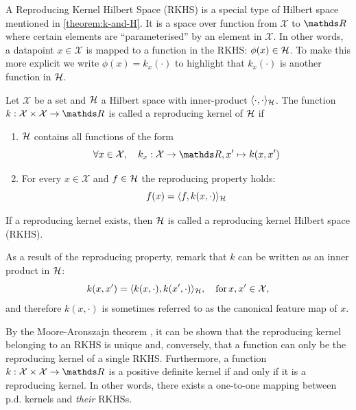 A Reproducing Kernel Hilbert Space (RKHS) is a special type of Hilbert space mentioned in \cref{theorem:k-and-H}. It is a space over function from $\mathcal{X}$ to $\Reals$ where certain elements are ``parameterised'' by an element in $\mathcal{X}$. In other words, a datapoint $x \in \mathcal{X}$ is mapped to a function in the RKHS: $\phi(x) \in {\mathcal{H}}$. To make this more explicit we write $\phi(x) = k_x(\cdot)$ to highlight that $k_x(\cdot)$ is another function in ${\mathcal{H}}$.
\begin{definition}
  \label{def:rkhs}
  Let $\mathcal{X}$ be a set and ${\mathcal{H}}$ a Hilbert space with inner-product $\langle \cdot, \cdot \rangle_{{\mathcal{H}}}$. The function $k: \mathcal{X} \times \mathcal{X} \rightarrow \Reals$ is called a reproducing kernel of ${\mathcal{H}}$ if
  \begin{enumerate}
    \item ${\mathcal{H}}$ contains all functions of the form
    \begin{equation}
      \forall x \in \mathcal{X},\quad k_x: \mathcal{X} \rightarrow \Reals, x' \mapsto k(x, x')
    \end{equation}
    \item For every $x \in \mathcal{X}$ and $f \in {\mathcal{H}}$ the reproducing property holds:
    \begin{equation}
      f(x) = \langle f, k(x, \cdot) \rangle_{{\mathcal{H}}}
    \end{equation}
  \end{enumerate}
If a reproducing kernel exists, then ${\mathcal{H}}$ is called a reproducing kernel Hilbert space (RKHS).
\end{definition}
As a result of the reproducing property, remark that $k$ can be written as an inner product in ${\mathcal{H}}$:
\begin{equation}
  k(x, x') = \langle k(x, \cdot), k(x', \cdot) \rangle_{{\mathcal{H}}},\quad\text{for}\,x,x'\in\mathcal{X},
\end{equation}
and therefore $k(x, \cdot)$ is sometimes referred to as the canonical feature map of $x$.


By the Moore-Aronszajn theorem \citep{aronszajn1950theory}, it can be shown that the reproducing kernel belonging to an RKHS is unique and, conversely, that a function can only be the reproducing kernel of a single RKHS. Furthermore, a function $k:\mathcal{X} \times \mathcal{X} \rightarrow \Reals$ is a positive definite kernel if and only if it is a reproducing kernel. In other words, there exists a one-to-one mapping between p.d. kernels and \emph{their} RKHSs.

